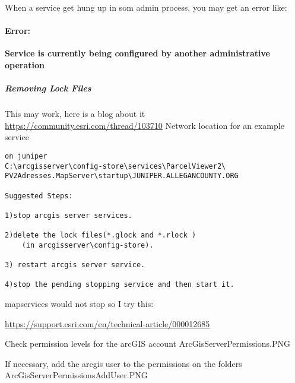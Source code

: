 \documentclass[class=book , crop=false, titlepage, twoside, multi={itemize, figure, verbatim}, float=false]{standalone}
\begin{document}
\noindent When a service get hung up in som admin process, you may get an error like:
\paragraph*{Error: \texorpdfstring{\\}{}}
\noindent \textbf{Service is currently being configured by another administrative operation}
\subparagraph[Remove Lock Files]{Removing Lock Files \texorpdfstring{\\}{}}
This may work, here is a blog about it\\
\href{https://community.esri.com/thread/103710}{https://community.esri.com/thread/103710}
Network location for an example service\\
\begin{verbatim}
on juniper
C:\arcgisserver\config-store\services\ParcelViewer2\
PV2Adresses.MapServer\startup\JUNIPER.ALLEGANCOUNTY.ORG

Suggested Steps:

1)stop arcgis server services.

2)delete the lock files(*.glock and *.rlock )
    (in arcgisserver\config-store).

3) restart arcgis server service.

4)stop the pending stopping service and then start it.
\end{verbatim}


mapservices would not stop so I try this:


\href{https://support.esri.com/en/technical-article/000012685}{https://support.esri.com/en/technical-article/000012685}


Check permission levels for the arcGIS account
ArcGisServerPermissions.PNG


If necessary, add the arcgis user to the permissions on the folders
ArcGisServerPermissionsAddUser.PNG
\end{document}
